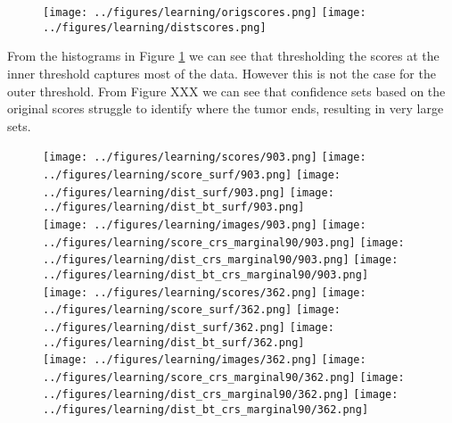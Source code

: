 \begin{figure}
		\centering
		\texttt{[image: ../figures/learning/origscores.png]}
		\texttt{[image: ../figures/learning/distscores.png]}
		\label{scorehists}
\end{figure}
From the histograms in Figure \ref{scorehists} we can see that thresholding the scores at the inner threshold captures most of the data. However this is not the case for the outer threshold. From Figure XXX we can see that confidence sets based on the original scores struggle to identify where the tumor ends, resulting in very large sets. 

\begin{figure}
\begin{center}
	\texttt{[image: ../figures/learning/scores/903.png]}
		\texttt{[image: ../figures/learning/score\_surf/903.png]}	\texttt{[image: ../figures/learning/dist\_surf/903.png]}
		\texttt{[image: ../figures/learning/dist\_bt\_surf/903.png]}\\
		\texttt{[image: ../figures/learning/images/903.png]}
	\texttt{[image: ../figures/learning/score\_crs\_marginal90/903.png]}
	\texttt{[image: ../figures/learning/dist\_crs\_marginal90/903.png]}
	\texttt{[image: ../figures/learning/dist\_bt\_crs\_marginal90/903.png]}\\
\vspace{0.5cm}
		\texttt{[image: ../figures/learning/scores/362.png]}
	\texttt{[image: ../figures/learning/score\_surf/362.png]}	\texttt{[image: ../figures/learning/dist\_surf/362.png]}
	\texttt{[image: ../figures/learning/dist\_bt\_surf/362.png]}\\
	\texttt{[image: ../figures/learning/images/362.png]}
	\texttt{[image: ../figures/learning/score\_crs\_marginal90/362.png]}
	\texttt{[image: ../figures/learning/dist\_crs\_marginal90/362.png]}
	\texttt{[image: ../figures/learning/dist\_bt\_crs\_marginal90/362.png]}
\end{center}

\end{figure}
